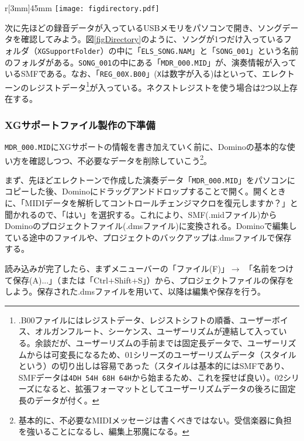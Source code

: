 \documentclass[uplatex, 10pt, dvipdfmx]{jsarticle}
\numberwithin{equation}{section}
\newcommand{\emphj}[1]{\textbf{\textrm{\textgt{{#1}}}}}
\begin{document}
\newpage

\begin{wrapfigure}[8]{r}[3mm]{45mm}
  \centering
  \texttt{[image: figdirectory.pdf]}
  \caption{ソング内の構造。}
  \label{figDirectory}
\end{wrapfigure}

次に先ほどの録音データが入っているUSBメモリをパソコンで開き、ソングデータを確認してみよう。図\ref{figDirectory}のように、ソングが1つだけ入っているフォルダ（\texttt{XGSupportFolder}）の中に「\texttt{ELS_SONG.NAM}」と「\texttt{SONG_001}」という名前のフォルダがある。\texttt{SONG_001}の中にある「\texttt{MDR_000.MID}」が、演奏情報が入っているSMFである。なお、「\texttt{REG_00X.B00}」(\texttt{X}は数字が入る)は\emphj{バルクファイル}といって、エレクトーンのレジストデータ\footnote{.B00ファイルにはレジストデータ、レジストシフトの順番、ユーザーボイス、オルガンフルート、シーケンス、ユーザーリズムが連結して入っている\cite{B00}。余談だが、ユーザーリズムの手前までは固定長データで、ユーザーリズムからは可変長になるため、01シリーズのユーザーリズムデータ（スタイルという）の切り出しは容易であった（スタイルは基本的にはSMFであり、SMFデータは\texttt{4DH 54H 68H 64H}から始まるため、これを探せば良い）。02シリーズになると、拡張フォーマットとしてユーザーリズムデータの後ろに固定長のデータが付く。}が入っている。ネクストレジストを使う場合は2つ以上存在する。

\subsubsection{XGサポートファイル製作の下準備}
\texttt{MDR_000.MID}にXGサポートの情報を書き加えていく前に、Dominoの基本的な使い方を確認しつつ、不必要なデータを削除していこう\footnote{基本的に、不必要なMIDIメッセージは書くべきではない。受信楽器に負担を強いることになるし、編集上邪魔になる。}。

まず、先ほどエレクトーンで作成した演奏データ「\texttt{MDR_000.MID}」をパソコンにコピーした後、Dominoにドラッグアンドドロップすることで開く。開くときに、「MIDIデータを解析してコントロールチェンジマクロを復元しますか？」と聞かれるので、「はい」を選択する。これにより、SMF(.midファイル)からDominoのプロジェクトファイル(.dmsファイル)に変換される。Dominoで編集している途中のファイルや、プロジェクトのバックアップは.dmsファイルで保存する。

読み込みが完了したら、まずメニューバーの「ファイル(F)」$\rightarrow$ 「名前をつけて保存(A)...」（または「Ctrl$+$Shift$+$S」）から、プロジェクトファイルの保存をしよう。保存された.dmsファイルを用いて、以降は編集や保存を行う。
\end{document}

